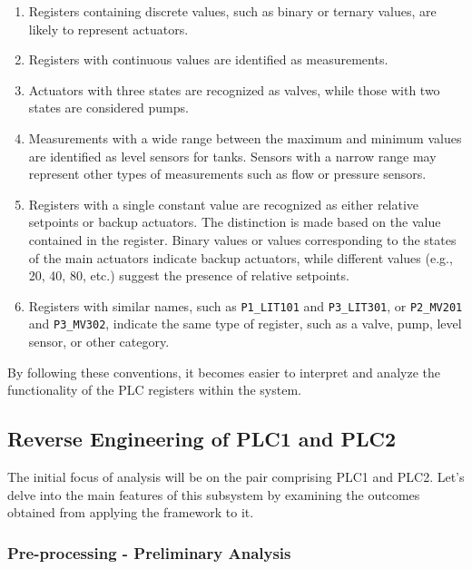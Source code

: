 \begin{enumerate}
	\item Registers containing discrete values, such as binary or ternary values, are likely to represent actuators.
	
	\item Registers with continuous values are identified as measurements.
	
	\item Actuators with three states are recognized as valves, while those with two states are considered pumps.
	
	\item Measurements with a wide range between the maximum and minimum values are identified as level sensors for tanks. Sensors with a narrow range may represent other types of measurements such as flow or pressure sensors.
	
	\item Registers with a single constant value are recognized as either relative setpoints or backup actuators. The distinction is made based on the value contained in the register. Binary values or values corresponding to the states of the main actuators indicate backup actuators, while different values (e.g., 20, 40, 80, etc.) suggest the presence of relative setpoints.

	\item Registers with similar names, such as \texttt{P1\_LIT101} and \texttt{P3\_LIT301}, or \texttt{P2\_MV201} and \texttt{P3\_MV302}, indicate the same type of register, such as a valve, pump, level sensor, or other category.
\end{enumerate}

By following these conventions, it becomes easier to interpret and analyze the functionality of the PLC registers within the system.

\subsection{Reverse Engineering of PLC1 and PLC2}
\label{subsec:6_P1P2_analysis}
The initial focus of analysis will be on the pair comprising PLC1 and PLC2. Let's delve into the main features of this subsystem by examining the outcomes obtained from applying the framework to it.

\subsubsection{Pre-processing - Preliminary Analysis}
\label{subsubsec:6_P1P2_preprocessing}

